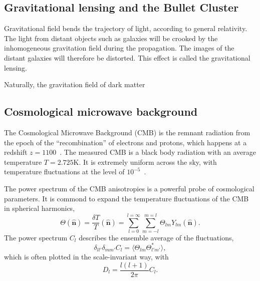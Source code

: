 \documentclass[doublespace,nopageskip]{VTthesis} %
\begin{document}
\subsection{Gravitational lensing and the Bullet Cluster}

Gravitational field bends the trajectory of light, according to general relativity. The light from distant objects such as galaxies will be crooked by the inhomogeneous gravitation field during the propagation. The images of the distant galaxies will therefore be distorted. This effect is called the gravitational lensing. 

Naturally, the gravitation field of dark matter 

\subsection{Cosmological microwave background}

The Cosmological Microwave Background (CMB) is the remnant radiation from the epoch of the ``recombination'' of electrons and protons, which happens at a redshift $z = 1100$~\cite{2003moco.book.....D}. The measured CMB is a black body radiation with an average temperature $T = 2.725$K. It is extremely uniform across the sky, with temperature fluctuations at the level of $10^{-5}$~\cite{2002ARA&A..40..171H}. 

The power spectrum of the CMB anisotropies is a powerful probe of cosmological parameters.
It is commond to expand the temperature fluctuations of the CMB in spherical harmonics,
\begin{equation}
    \Theta(\hat{\bm n}) = \frac{\delta T}{T}(\hat{\bm n}) = \sum^{l=\infty}_{l=0}\sum^{m=l}_{m=-l} \Theta_{lm}Y_{lm}(\hat{\bm n}).
\end{equation}
The power spectrum $C_l$ describes the ensemble average of the fluctuations,
\begin{equation}
    \delta_{ll'}\delta_{mm'}C_l = \langle\Theta_{lm}\Theta^*_{l'm'}\rangle,
\end{equation}
which is often plotted in the scale-invariant way, with
\begin{equation}
    D_l = \frac{l(l+1)}{2\pi}C_l.
\end{equation}
\end{document}
